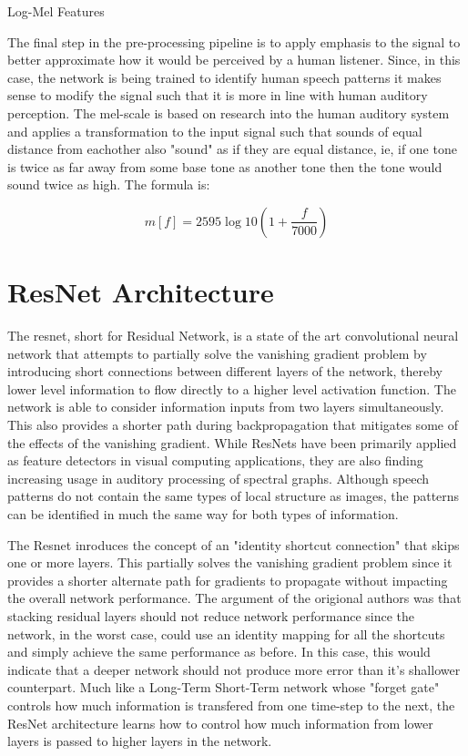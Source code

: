 Log-Mel Features

The final step in the pre-processing pipeline is to apply emphasis to the signal to better approximate how it would be perceived by a human listener. Since, in this case, the network is being trained to identify human speech patterns it makes sense to modify the signal such that it is more in line with human auditory perception. The mel-scale is based on research into the human auditory system and applies a transformation to the input signal such that sounds of equal distance from eachother also "sound" as if they are equal distance, ie, if one tone is twice as far away from some base tone as another tone then the tone would sound twice as high. The formula is:

\[ m[f] = 2595 \log{10}(1 + \frac{f}{7000}) \]



\section{ResNet Architecture}
\label{cha:methods/resnet architecture}

The resnet, short for Residual Network, is a state of the art convolutional neural network that attempts to partially solve the vanishing gradient problem by introducing short connections between different layers of the network, thereby lower level information to flow directly to a higher level activation function. The network is able to consider information inputs from two layers simultaneously. This also provides a shorter path during backpropagation that mitigates some of the effects of the vanishing gradient. While ResNets have been primarily applied as feature detectors in visual computing applications, they are also finding increasing usage in auditory processing of spectral graphs. Although speech patterns do not contain the same types of local structure as images, the patterns can be identified in much the same way for both types of information.

The Resnet inroduces the concept of an "identity shortcut connection" that skips one or more layers. This partially solves the vanishing gradient problem since it provides a shorter alternate path for gradients to propagate without impacting the overall network performance. The argument of the origional authors was that stacking residual layers should not reduce network performance since the network, in the worst case, could use an identity mapping for all the shortcuts and simply achieve the same performance as before. In this case, this would indicate that a deeper network should not produce more error than it's shallower counterpart. Much like a Long-Term Short-Term network whose "forget gate" controls how much information is transfered from one time-step to the next, the ResNet architecture learns how to control how much information from lower layers is passed to higher layers in the network.

